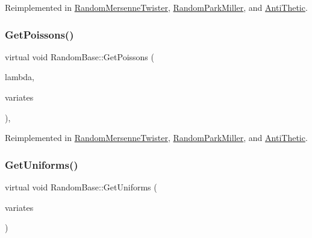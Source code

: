 Reimplemented in \hyperlink{classRandomMersenneTwister_a138aef807030513957f98abe6235e791}{Random\+Mersenne\+Twister}, \hyperlink{classRandomParkMiller_ac9ecb9d60e18a611f4e4458cae09998c}{Random\+Park\+Miller}, and \hyperlink{classAntiThetic_ad14fda6b35f6370d744d0ea53d5b80ba}{Anti\+Thetic}.

\hypertarget{classRandomBase_aa2e79f1f4c55c36df9c701d29e9b08a5}{}\label{classRandomBase_aa2e79f1f4c55c36df9c701d29e9b08a5} 
\subsubsection{\texorpdfstring{Get\+Poissons()}{GetPoissons()}}
{\footnotesize\ttfamily virtual void Random\+Base\+::\+Get\+Poissons (\begin{DoxyParamCaption}\item[{double}]{lambda,  }\item[{\hyperlink{classMJArray}{M\+J\+Array} \&}]{variates }\end{DoxyParamCaption})\hspace{0.3cm}{\ttfamily [inline]}, {\ttfamily [virtual]}}



Reimplemented in \hyperlink{classRandomMersenneTwister_a7b53f211616ce5764705b192fbc0a009}{Random\+Mersenne\+Twister}, \hyperlink{classRandomParkMiller_adcc2619058ca8a30dab9618a54c82dd2}{Random\+Park\+Miller}, and \hyperlink{classAntiThetic_af37fd70c21d1d4bf65a0494a4a8c5459}{Anti\+Thetic}.

\hypertarget{classRandomBase_aa061fb77f53969f6fbe40c7454c69eb9}{}\label{classRandomBase_aa061fb77f53969f6fbe40c7454c69eb9} 
\subsubsection{\texorpdfstring{Get\+Uniforms()}{GetUniforms()}\hspace{0.1cm}{\footnotesize\ttfamily [1/2]}}
{\footnotesize\ttfamily virtual void Random\+Base\+::\+Get\+Uniforms (\begin{DoxyParamCaption}\item[{\hyperlink{classMJArray}{M\+J\+Array} \&}]{variates }\end{DoxyParamCaption})\hspace{0.3cm}{\ttfamily [pure virtual]}}



